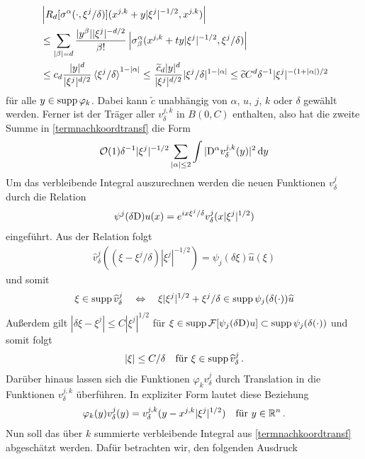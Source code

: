 \begin{align}
&\left\lvert R_d[\sigma^\alpha(\cdot,\xi^j/\delta)](x^{j,k}+y|\xi^j|^{-1/2},x^{j,k})\right\rvert \\
&\le \sum_{\lvert\beta\rvert=d}\frac{|y^\beta||\xi^j|^{-d/2}}{\beta!}\left\lvert\sigma^\alpha_\beta(x^{j,k}+ ty|\xi^j|^{-1/2},\xi^j/\delta) \right\rvert\\
&\le c_d \frac{\lvert y\rvert ^d}{\lvert\xi^j\rvert^{d/2}}\braket{\xi^j/\delta}^{1-\lvert\alpha\rvert} \le\frac{\widetilde c_d\lvert y\rvert ^d}{\lvert\xi^j\rvert^{d/2}}|\xi^j/\delta|^{1-\lvert\alpha\rvert} \le \widetilde c C ^d\delta^{-1}|\xi^j|^{-(1+\lvert\alpha\rvert)/2}
\end{align}
für alle $y\in\operatorname{supp}\varphi_k$. Dabei kann $\widetilde c$ unabhängig von  $\alpha$, $u$, $j$, $k$ oder $\delta$ gewählt werden. Ferner ist der Träger aller $v_\delta^{j,k}$ in $B(0,C)$ enthalten, also hat die zweite Summe in \eqref{termnachkoordtransf} die Form
\begin{align}\label{restnachkoord}
\mathcal O(1) \delta^{-1}|\xi^j|^{-1/2}\sum_{\lvert\alpha\rvert\le 2}\int  |\mathrm D^\alpha v^{j,k}_\delta(y)|^2\,\mathrm d y
\end{align}
Um das verbleibende Integral auszurechnen werden die neuen Funktionen $v^j_\delta$ durch die Relation
\begin{align}
\psi^j(\delta\mathrm D)u(x) = e^{ix\xi^j/\delta}v^j_\delta(x|\xi^j|^{1/2})
\end{align}
eingeführt. Aus der Relation folgt
\begin{align}
\widehat v^j_\delta ((\xi-\xi^j/\delta)|\xi^j|^{-1/2}) = \psi_j(\delta\xi)\widehat u(\xi)
\end{align}
und somit
\begin{align}
\xi \in\operatorname{supp}\widehat v^j_\delta \quad\Leftrightarrow\quad \xi|\xi^j|^{1/2} + \xi^j/\delta\in\operatorname{supp} \psi_j(\delta(\cdot))\widehat u
\end{align}
Außerdem gilt $|\delta\xi-\xi^j|\le C|\xi^j|^{1/2}$ für $\xi\in\operatorname{supp} \mathcal F[\psi_j(\delta\mathrm D)u]\subset\operatorname{supp} \psi_j(\delta (\cdot))$ und somit folgt
\begin{align}
|\xi|\le C/\delta \quad \text{für } \xi \in\operatorname{supp}\widehat v^j_\delta\,.
\end{align}
Darüber hinaus lassen sich die Funktionen $\varphi_k v^j_\delta$ durch Translation in die Funktionen $v^{j,k}_\delta$ überführen. In expliziter Form lautet diese Beziehung
\begin{align}
\varphi_k(y) v^j_\delta (y) = v^{j,k}_\delta (y-x^{j,k}|\xi^j|^{1/2})\quad\text{für }y\in\mathbb R^n\,.
\end{align}
Nun soll das über $k$ summierte verbleibende Integral aus \eqref{termnachkoordtransf} abgeschätzt werden. Dafür betrachten wir, den folgenden Ausdruck
